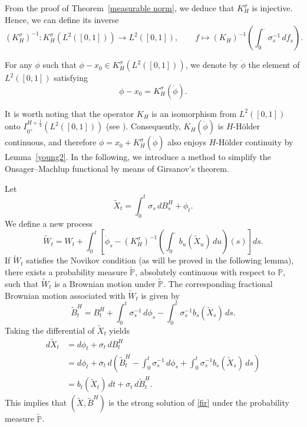 \documentclass[preprint,12pt]{elsarticle}
\theoremstyle{definition}  %
\theoremstyle{plain}  %
\begin{document}
From the proof of Theorem~\ref{measurable norm}, we deduce that $K_H^\sigma$ is injective.  
Hence, we can define its inverse
\[
  (K_H^\sigma)^{-1} : K_H^\sigma(L^2([0,1])) \to L^2([0,1]), 
   \qquad 
   f \mapsto (K_H)^{-1}\left(\int_0^\cdot \sigma_s^{-1} \, df_s\right).
\]

For any $\phi$ such that $\phi - x_0 \in K_H^\sigma(L^2([0,1]))$, we denote by $\dot{\phi}$ the element of $L^2([0,1])$ satisfying
\begin{equation*}
    \phi - x_0 = K_H^\sigma(\dot{\phi}).
\end{equation*}

It is worth noting that the operator $K_H$ is an isomorphism from $L^2([0,1])$ onto 
$I_{0^+}^{H+\frac{1}{2}}(L^2([0,1]))$ 
(see \cite[Theorem~2.1]{Decreusefond1999}).  
Consequently, $K_H(\dot{\phi})$ is $H$-H\"older continuous, and therefore $\phi=x_0+K_H^\sigma(\dot{\phi})$ also enjoys $H$-H\"older continuity by Lemma~\ref{young2}.
In the following, we introduce a method to simplify the Onsager--Machlup functional by means of Girsanov's theorem.  


Let 
\[
\tilde{X}_t = \int_0^t \sigma_s \, dB^H_s + \phi_t.
\]
We define a new process
\begin{equation}
    \tilde{W}_t 
    = W_t + \int_0^t 
    \left[
        \dot{\phi}_s 
        - (K_H^\sigma)^{-1}\!\left( \int_0^{\cdot} b_u(\tilde{X}_u) \, du \right)(s)
    \right] ds.  \label{Girtrans}
\end{equation}
If $\tilde{W}_t$ satisfies the Novikov condition (as will be proved in the following lemma),  
there exists a probability measure $\tilde{\mathbb{P}}$, absolutely continuous with respect to $\mathbb{P}$,  
such that $\tilde{W}_t$ is a Brownian motion under $\tilde{\mathbb{P}}$.  
The corresponding fractional Brownian motion associated with $\tilde{W}_t$ is given by
\begin{equation*}
    \tilde{B}^H_t 
    = B^H_t 
    + \int_0^t \sigma_s^{-1} \, d\phi_s
    - \int_0^t \sigma_s^{-1} b_s(\tilde{X}_s) \, ds.
\end{equation*}
Taking the differential of $\tilde{X}_t$ yields
\begin{align*}
    d\tilde{X}_t 
    &= d\phi_t + \sigma_t \, dB^H_t \\
    &= d\phi_t + \sigma_t \, d\!\left( 
        \tilde{B}^H_t 
        - \int_0^t \sigma_s^{-1} \, d\phi_s 
        + \int_0^t \sigma_s^{-1} b_s(\tilde{X}_s) \, ds  
    \right) \\
    &= b_t(\tilde{X}_t) \, dt + \sigma_t \, d\tilde{B}^H_t.
\end{align*}
This implies that $(\tilde{X}, \tilde{B}^H)$ is the strong solution of \eqref{fir} under the probability measure $\tilde{\mathbb{P}}$.
\end{document}

